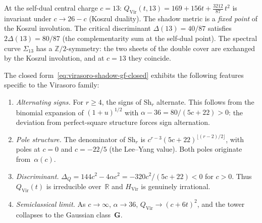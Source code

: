 \begin{remark}[Self-duality at $c = 13$]
\label{rem:virasoro-self-dual-shadow}
At the self-dual central charge $c = 13$: $Q_{\mathrm{Vir}}(t, 13) = 169 + 156t + \tfrac{3212}{87}\,t^2$ is invariant under $c \to 26{-}c$ (Koszul duality).  The shadow metric is a \emph{fixed point} of the Koszul involution.  The critical discriminant $\Delta(13) = 40/87$ satisfies $2\Delta(13) = 80/87$ (the complementarity sum at the self-dual point).  The spectral curve $\Sigma_{13}$ has a $\mathbb{Z}/2$-symmetry: the two sheets of the double cover are exchanged by the Koszul involution, and at $c = 13$ they coincide.
\end{remark}

\begin{remark}
\label{rem:virasoro-shadow-generating-function}
The closed form~\eqref{eq:virasoro-shadow-gf-closed} exhibits
the following features specific to the Virasoro family:
\begin{enumerate}[label=\textup{(\roman*)}]
\item \emph{Alternating signs.}
  For $r \geq 4$, the signs of $\mathrm{Sh}_r$ alternate.
  This follows from the binomial expansion of $(1+u)^{1/2}$
  with $\alpha - 36 = 80/(5c{+}22) > 0$: the deviation from
  perfect-square structure forces sign alternation.

\item \emph{Pole structure.}
  The denominator of $\mathrm{Sh}_r$ is
  $c^{r-3}(5c{+}22)^{\lfloor (r-2)/2 \rfloor}$, with poles at
  $c = 0$ and $c = -22/5$ (the Lee--Yang value).  Both poles
  originate from~$\alpha(c)$.

\item \emph{Discriminant.}
  $\Delta_Q = 144c^2 - 4\alpha c^2 = -320c^2/(5c{+}22) < 0$
  for $c > 0$.  Thus $Q_{\mathrm{Vir}}(t)$ is irreducible
  over~$\mathbb{R}$ and $H_{\mathrm{Vir}}$ is genuinely irrational.

\item \emph{Semiclassical limit.}
  As $c \to \infty$, $\alpha \to 36$,
  $Q_{\mathrm{Vir}} \to (c+6t)^2$, and the tower collapses to
  the Gaussian class~$\mathbf{G}$.
\end{enumerate}
\end{remark}

